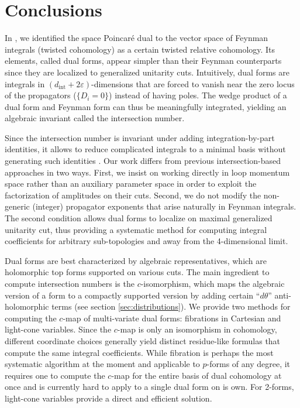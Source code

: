 \documentclass[11pt]{article}
\newcommand{\dint}{d_\text{int}}
\newcommand{\vep}{\varepsilon}
\begin{document}
\section{Conclusions \label{sec:conclusion}}

In \cite{Caron-Huot:2021xqj}, we identified the space Poincar\'e dual to the vector space of Feynman integrals (twisted cohomology) as a certain twisted relative cohomology. Its elements, called dual forms, appear simpler than their Feynman counterparts since they are localized to generalized unitarity cuts.
Intuitively, dual forms are integrals in $(\dint+2\vep)$-dimensions that are forced to vanish near the zero locus of the propagators ($\{D_i=0\}$) instead of having poles.
The wedge product of a dual form and Feynman form can thus be meaningfully integrated, yielding an algebraic invariant called the intersection number. 

Since the intersection number is invariant under adding integration-by-part identities, it allows to reduce complicated integrals to a minimal basis without generating such identities \cite{Mastrolia:2018uzb, Frellesvig:2019kgj, Frellesvig:2019uqt, Mizera:2019vvs, Mizera:2020wdt, Frellesvig:2020qot}. 
Our work differs from previous intersection-based approaches in two ways. 
First, we insist on working directly in loop momentum space rather than an auxiliary parameter space in order to exploit the factorization of amplitudes on their cuts. 
Second, we do not modify the non-generic (integer) propagator exponents that arise naturally in Feynman integrals. 
The second condition allows dual forms to localize on maximal generalized unitarity cut, thus providing a systematic method for computing
integral coefficients for arbitrary sub-topologies and away from the 4-dimensional limit. 

Dual forms are best characterized by algebraic representatives, which are holomorphic top forms supported on various cuts.
The main ingredient to compute intersection numbers is the $c$-isomorphism, which maps the algebraic version of a form
to a compactly supported version by adding certain ``$d\theta$'' anti-holomorphic terms (see section \eqref{sec:distributions}).
We provide two methods for computing the $c$-map of multi-variate dual forms: fibrations in Cartesian and light-cone variables.
Since the $c$-map is only an isomorphism in cohomology,
different coordinate choices generally yield distinct residue-like formulas that compute the same integral coefficients.
While fibration is perhaps the most systematic algorithm at the moment and applicable to $p$-forms of any degree,
it requires one to compute the $c$-map for the entire basis of dual cohomology at once and is currently hard to apply to a single dual form on is own.
For 2-forms, light-cone variables provide a direct and efficient solution.
\end{document}
